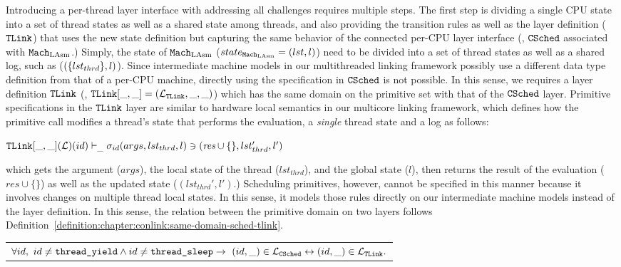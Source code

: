 Introducing a per-thread layer interface with addressing all challenges requires multiple steps. 
The first step is
dividing a single CPU state into a set of thread states as well as a shared state among threads,
and also providing 
the transition rules as well as the layer definition (${{\mathrm{\texttt{TLink}}}}$) that uses the new state definition but capturing 
the same behavior of the connected per-CPU layer interface (\ie, ${{\mathrm{\texttt{CSched}}}}$ associated with ${\mathrm{\texttt{Mach}}}_{\mathrm{LAsm}}$.)
Simply, the state of ${\mathrm{\texttt{Mach}}}_{\mathrm{LAsm}}$ ($state_{{\mathrm{\texttt{Mach}}}_{\mathrm{LAsm}}} = (lst, l)$) need to be divided into 
a set of thread states as well as a shared log, such as ($(\{lst_{thrd}\}, l)$).
Since intermediate machine models in our multithreaded linking framework possibly use a different data type definition from that of a per-CPU machine, 
directly using the specification in  ${{\mathrm{\texttt{CSched}}}}$ is not possible. 
In this sense, 
we requires a layer definition ${{\mathrm{\texttt{TLink}}}}$ (\ie, ${{\mathrm{\texttt{TLink}}}}[\_, \_] = (\mathcal{L}_{{{\mathrm{\texttt{TLink}}}}}, \_, \_)$) which has the same domain on the primitive set with that of the ${{\mathrm{\texttt{CSched}}}}$ layer.
Primitive specifications in the ${{\mathrm{\texttt{TLink}}}}$ layer are similar to hardware local semantics in our multicore linking framework,
which defines how the primitive call modifies a thread's state that performs the evaluation,
a \textit{single} thread state and a log as follows:
\begin{center}
${{\mathrm{\texttt{TLink}}}}[\_, \_](\mathcal{L})(id)
 \vdash_{\_}  \sigma_{id}(args, lst_{thrd}, l) \ni (\textit{res}\cup \{\}, lst_{thrd}', l')$
\end{center}
which gets the argument ($args$), the local state of the thread ($lst_{thrd}$), and the global state ($l$), then 
returns the result of the evaluation ($\textit{res}\cup \{\}$) as well as the updated state ($(lst_{thrd}', l')$.)
Scheduling primitives, however, cannot be specified in this manner because it involves changes on multiple thread local states. 
 In this sense, it models those rules directly on our intermediate machine models 
 instead of the layer definition.
In this sense, 
the relation between the primitive domain on two layers follows
Definition~\ref{definition:chapter:conlink:same-domain-sched-tlink}.


%

\begin{definition}
\label{definition:chapter:conlink:same-domain-sched-tlink}
\begin{tabular}{P{0.95\textwidth}}
$\forall id,\ id \neq {\mathrm{\texttt{thread\_yield}}} \wedge id \neq {\mathrm{\texttt{thread\_sleep}}} \rightarrow 
 \ (id, \_) \in \mathcal{L}_{{{\mathrm{\texttt{CSched}}}}} \leftrightarrow (id, \_) \in  \mathcal{L}_{{{\mathrm{\texttt{TLink}}}}}.$\\
\end{tabular}
\end{definition}


